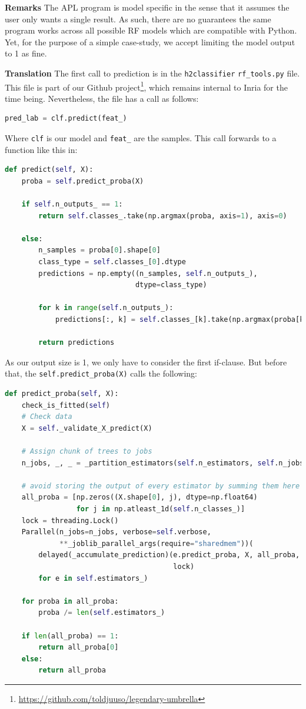 \documentclass{IEEEtran}
\begin{document}
\textbf{Remarks} The APL program is model specific in the sense that it assumes the user only wants a single result. As such, there are no guarantees the same program works across all possible RF models which are compatible with Python. Yet, for the purpose of a simple case-study, we accept limiting the model output to 1 as fine.

\textbf{Translation} The first call to prediction is in the \verb|h2classifier| \verb|rf_tools.py| file. This file is part of our Github project\footnote{\url{https://github.com/toldjuuso/legendary-umbrella}}, which remains internal to Inria for the time being. Nevertheless, the file has a call as follows:

\begin{lstlisting}[language=Python]
pred_lab = clf.predict(feat_)
\end{lstlisting}

Where \verb|clf| is our model and \verb|feat_| are the samples. This call forwards to a function like this in:

\begin{lstlisting}[language=Python]
def predict(self, X):
    proba = self.predict_proba(X)

    if self.n_outputs_ == 1:
        return self.classes_.take(np.argmax(proba, axis=1), axis=0)

    else:
        n_samples = proba[0].shape[0]
        class_type = self.classes_[0].dtype
        predictions = np.empty((n_samples, self.n_outputs_),
                               dtype=class_type)

        for k in range(self.n_outputs_):
            predictions[:, k] = self.classes_[k].take(np.argmax(proba[k], axis=1), axis=0)

        return predictions
\end{lstlisting}

As our output size is 1, we only have to consider the first if-clause. But before that, the \verb|self.predict_proba(X)| calls the following:

\begin{lstlisting}[language=Python]
def predict_proba(self, X):
    check_is_fitted(self)
    # Check data
    X = self._validate_X_predict(X)

    # Assign chunk of trees to jobs
    n_jobs, _, _ = _partition_estimators(self.n_estimators, self.n_jobs)

    # avoid storing the output of every estimator by summing them here
    all_proba = [np.zeros((X.shape[0], j), dtype=np.float64)
                 for j in np.atleast_1d(self.n_classes_)]
    lock = threading.Lock()
    Parallel(n_jobs=n_jobs, verbose=self.verbose,
             **_joblib_parallel_args(require="sharedmem"))(
        delayed(_accumulate_prediction)(e.predict_proba, X, all_proba,
                                        lock)
        for e in self.estimators_)

    for proba in all_proba:
        proba /= len(self.estimators_)

    if len(all_proba) == 1:
        return all_proba[0]
    else:
        return all_proba
\end{lstlisting}
\end{document}
